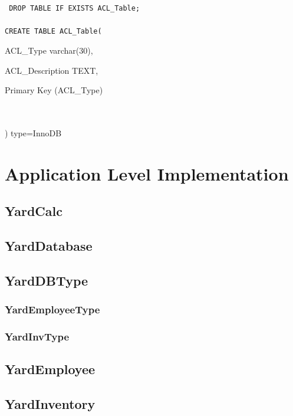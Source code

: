 \documentclass{report}
\begin{document}
{{{{   	{\tt\small
	DROP TABLE IF EXISTS ACL\_Table;\\
	\\
	CREATE TABLE ACL\_Table(
	\begin{list}{}
		\item{ACL\_Type varchar(30),}
		\item{ACL\_Description TEXT,}
		\item{Primary Key (ACL\_Type)}
	\end{list}\\
	\\
	) type=InnoDB
	}




    \section{Application Level Implementation}

    \subsection{YardCalc}

    \subsection{YardDatabase}

    \subsection{YardDBType}

    \subsubsection{YardEmployeeType}

    \subsubsection{YardInvType}


    \subsection{YardEmployee}

    \subsection{YardInventory}

}}}}
\end{document}
